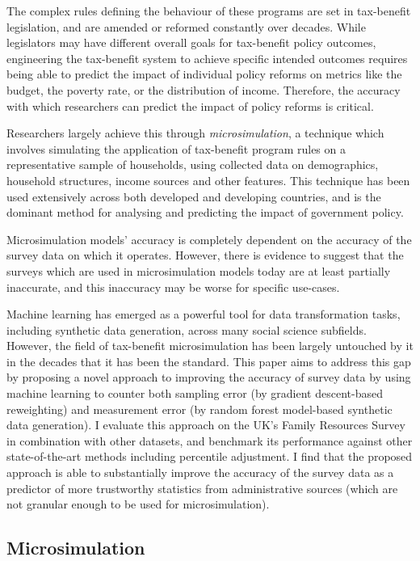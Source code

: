 \documentclass[twocolumn]{article}
\begin{document}
The complex rules defining the behaviour of these programs are set in tax-benefit legislation, and are amended or reformed constantly over decades. While legislators may have different overall goals for tax-benefit policy outcomes, engineering the tax-benefit system to achieve specific intended outcomes requires being able to predict the impact of individual policy reforms on metrics like the budget, the poverty rate, or the distribution of income. Therefore, the accuracy with which researchers can predict the impact of policy reforms is critical.

Researchers largely achieve this through \emph{microsimulation}, a technique which involves simulating the application of tax-benefit program rules on a representative sample of households, using collected data on demographics, household structures, income sources and other features. This technique has been used extensively across both developed and developing countries, and is the dominant method for analysing and predicting the impact of government policy.

Microsimulation models' accuracy is completely dependent on the accuracy of the survey data on which it operates. However, there is evidence to suggest that the surveys which are used in microsimulation models today are at least partially inaccurate, and this inaccuracy may be worse for specific use-cases.

Machine learning has emerged as a powerful tool for data transformation tasks, including synthetic data generation, across many social science subfields. However, the field of tax-benefit microsimulation has been largely untouched by it in the decades that it has been the standard. This paper aims to address this gap by proposing a novel approach to improving the accuracy of survey data by using machine learning to counter both sampling error (by gradient descent-based reweighting) and measurement error (by random forest model-based synthetic data generation). I evaluate this approach on the UK's Family Resources Survey in combination with other datasets, and benchmark its performance against other state-of-the-art methods including percentile adjustment. I find that the proposed approach is able to substantially improve the accuracy of the survey data as a predictor of more trustworthy statistics from administrative sources (which are not granular enough to be used for microsimulation).

\subsection{Microsimulation}
\end{document}
